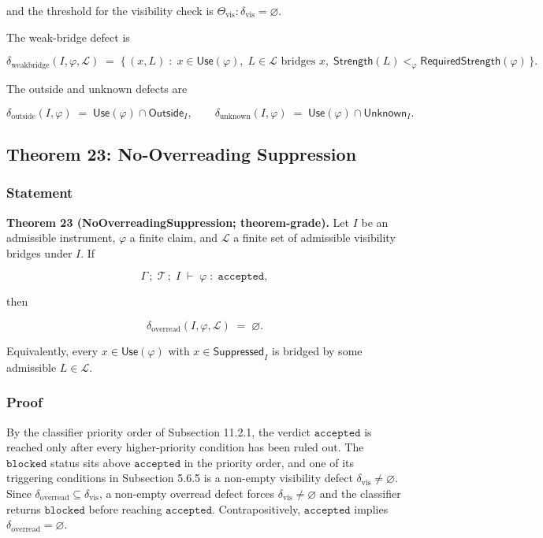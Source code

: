 \documentclass[11pt]{article}
\theoremstyle{definition}
\begin{document}
and the threshold for the visibility check is \(\Theta_{\mathrm{vis}}:\delta_{\mathrm{vis}}=\varnothing\).

The weak-bridge defect is

\[
\delta_{\mathrm{weakbridge}}(I,\varphi,\mathcal L)\;=\;\{\,(x,L)\;:\;x\in\mathsf{Use}(\varphi),\;L\in\mathcal L\text{ bridges }x,\;\mathsf{Strength}(L)<_{\varphi}\mathsf{RequiredStrength}(\varphi)\,\}.
\]

The outside and unknown defects are

\[
\delta_{\mathrm{outside}}(I,\varphi)\;=\;\mathsf{Use}(\varphi)\cap\mathsf{Outside}_I,\qquad
\delta_{\mathrm{unknown}}(I,\varphi)\;=\;\mathsf{Use}(\varphi)\cap\mathsf{Unknown}_I.
\]

\subsection{Theorem 23: No-Overreading Suppression}

\subsubsection{Statement}

\textbf{Theorem 23 (NoOverreadingSuppression; theorem-grade).} Let \(I\) be an admissible instrument, \(\varphi\) a finite claim, and \(\mathcal L\) a finite set of admissible visibility bridges under \(I\). If

\[
\Gamma\,;\;\mathcal T\,;\;I\;\vdash\;\varphi\;:\;\texttt{accepted},
\]

then

\[
\delta_{\mathrm{overread}}(I,\varphi,\mathcal L)\;=\;\varnothing.
\]

Equivalently, every \(x\in\mathsf{Use}(\varphi)\) with \(x\in\mathsf{Suppressed}_I\) is bridged by some admissible \(L\in\mathcal L\).

\subsubsection{Proof}

By the classifier priority order of Subsection 11.2.1, the verdict \(\texttt{accepted}\) is reached only after every higher-priority condition has been ruled out. The \(\texttt{blocked}\) status sits above \(\texttt{accepted}\) in the priority order, and one of its triggering conditions in Subsection 5.6.5 is a non-empty visibility defect \(\delta_{\mathrm{vis}}\neq\varnothing\). Since \(\delta_{\mathrm{overread}}\subseteq\delta_{\mathrm{vis}}\), a non-empty overread defect forces \(\delta_{\mathrm{vis}}\neq\varnothing\) and the classifier returns \(\texttt{blocked}\) before reaching \(\texttt{accepted}\). Contrapositively, \(\texttt{accepted}\) implies \(\delta_{\mathrm{overread}}=\varnothing\).
\end{document}
